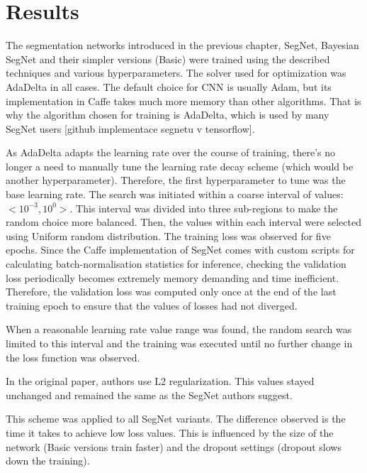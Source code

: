 \chapter{Results}

The segmentation networks introduced in the previous chapter, SegNet, Bayesian SegNet and their simpler versions (Basic) were trained using the described techniques and various hyperparameters. The solver used for optimization was AdaDelta in all cases.
The default choice for CNN is usually Adam, but its implementation in Caffe takes much more memory than other algorithms. That is why the algorithm chosen for training is AdaDelta, which is used by many SegNet users [github implementace segnetu v tensorflow].

As AdaDelta adapts the learning rate over the course of training, there's no longer a need to manually tune the learning rate decay scheme (which would be another hyperparameter). Therefore, the first hyperparameter to tune was the base learning rate. The search was initiated within a coarse interval of values: $ <10^{-3}, 10^{0}>  $. This interval was divided into three sub-regions to make the random choice more balanced. Then, the values within each interval were selected using Uniform random distribution. The training loss was observed for five epochs. Since the Caffe implementation of SegNet comes with custom scripts for calculating batch-normalisation statistics for inference, checking the validation loss periodically becomes extremely memory demanding and time inefficient. Therefore, the validation loss was computed only once at the end of the last training epoch to ensure that the values of losses had not diverged.  

When a reasonable learning rate value range was found, the random search was limited to this interval and the training was executed until no further change in the loss function was observed. 

In the original paper, authors use L2 regularization. This values stayed unchanged and remained the same as the SegNet authors suggest.  

This scheme was applied to all SegNet variants. The difference observed is the time it takes to achieve low loss values. This is influenced by the size of the network (Basic versions train faster) and the dropout settings (dropout slows down the training).  



